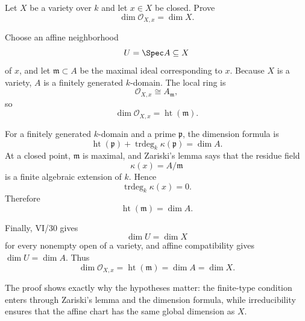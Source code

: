 \begin{problem}\label{prob:vi32-01}
Let \(X\) be a variety over \(k\) and let \(x\in X\) be closed. Prove
\[
\dim\mathcal O_{X,x}=\dim X.
\]

\end{problem}

\ifdefined\FullProblemDossiers
\begin{solution}
Choose an affine neighborhood
\[
U=\Spec A\subseteq X
\]
of \(x\), and let \(\mathfrak m\subset A\) be the maximal ideal corresponding to \(x\). Because \(X\) is a variety,
\(A\) is a finitely generated \(k\)-domain. The local ring is
\[
\mathcal O_{X,x}\cong A_{\mathfrak m},
\]
so
\[
\dim\mathcal O_{X,x}=\operatorname{ht}(\mathfrak m).
\]

For a finitely generated \(k\)-domain and a prime \(\mathfrak p\), the dimension formula is
\[
\operatorname{ht}(\mathfrak p)
+
\operatorname{trdeg}_k\kappa(\mathfrak p)
=
\dim A.
\]
At a closed point, \(\mathfrak m\) is maximal, and Zariski's lemma says that the residue field
\[
\kappa(x)=A/\mathfrak m
\]
is a finite algebraic extension of \(k\). Hence
\[
\operatorname{trdeg}_k\kappa(x)=0.
\]
Therefore
\[
\operatorname{ht}(\mathfrak m)=\dim A.
\]

Finally, VI/30 gives
\[
\dim U=\dim X
\]
for every nonempty open of a variety, and affine compatibility gives \(\dim U=\dim A\). Thus
\[
\boxed{
\dim\mathcal O_{X,x}
=
\operatorname{ht}(\mathfrak m)
=
\dim A
=
\dim X.
}
\]

The proof shows exactly why the hypotheses matter: the finite-type condition enters through Zariski's lemma and the
dimension formula, while irreducibility ensures that the affine chart has the same global dimension as \(X\).
\end{solution}
\fi
